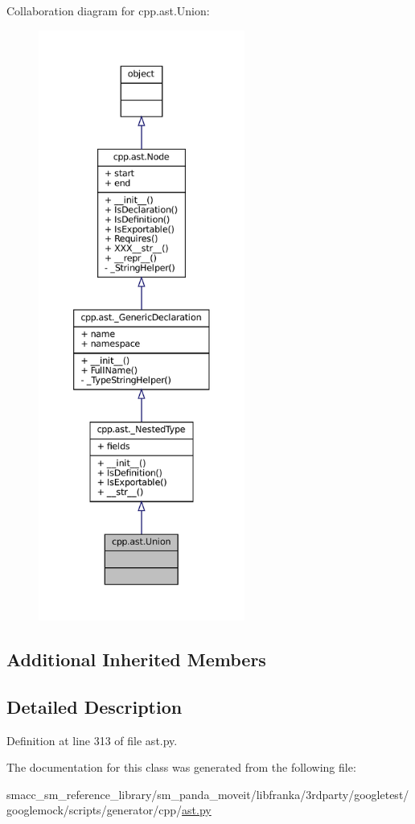 Collaboration diagram for cpp.\+ast.\+Union\+:
\nopagebreak
\begin{figure}[H]
\begin{center}
\leavevmode
\includegraphics[height=550pt]{classcpp_1_1ast_1_1Union__coll__graph}
\end{center}
\end{figure}
\subsection*{Additional Inherited Members}


\subsection{Detailed Description}


Definition at line 313 of file ast.\+py.



The documentation for this class was generated from the following file\+:\begin{DoxyCompactItemize}
\item 
smacc\+\_\+sm\+\_\+reference\+\_\+library/sm\+\_\+panda\+\_\+moveit/libfranka/3rdparty/googletest/googlemock/scripts/generator/cpp/\hyperlink{ast_8py}{ast.\+py}\end{DoxyCompactItemize}
